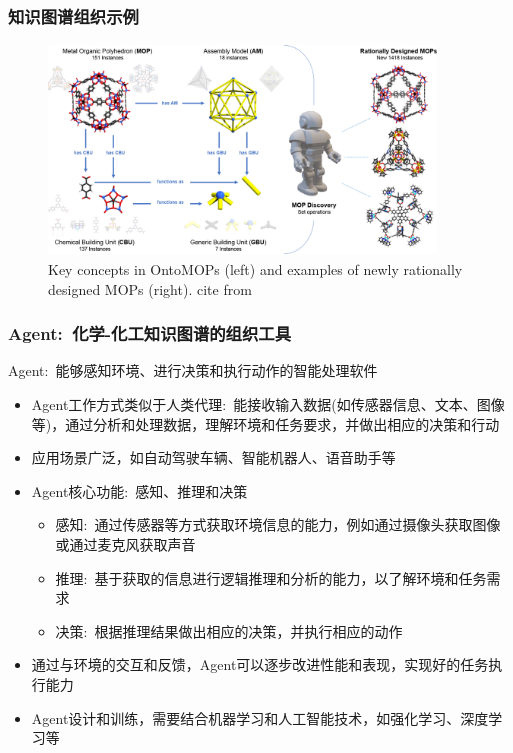 \frame
{
	\frametitle{知识图谱组织示例}
\begin{figure}[h!]
\centering
\vskip -8pt
\includegraphics[height=2.20in,width=4.05in,viewport=0 0 1330 700,clip]{Figures/Key_concepts-in-OntoMOPs-and-designed-MOPs.png}
\caption{\tiny\textrm{Key concepts in OntoMOPs (left) and examples of newly rationally designed MOPs (right). cite from~\cite{ACR56-128_2023}}}%
\label{Fig:OntoMOPs-MOPs}
\end{figure}
}

\frame
{
	\frametitle{\textrm{Agent}:~化学-化工知识图谱的组织工具}
	\textrm{Agent}:~能够感知环境、进行决策和执行动作的智能处理软件
	\begin{itemize}
		\item \textrm{Agent}工作方式类似于人类代理:~能接收输入数据(如传感器信息、文本、图像等)，通过分析和处理数据，理解环境和任务要求，并做出相应的决策和行动
		\item 应用场景广泛，如自动驾驶车辆、智能机器人、语音助手等
		\item \textrm{Agent}核心功能:~感知、推理和决策
			\begin{itemize}
				\item 感知:~通过传感器等方式获取环境信息的能力，例如通过摄像头获取图像或通过麦克风获取声音
				\item 推理:~基于获取的信息进行逻辑推理和分析的能力，以了解环境和任务需求
				\item 决策:~根据推理结果做出相应的决策，并执行相应的动作
			\end{itemize}
		\item 通过与环境的交互和反馈，\textrm{Agent}可以逐步改进性能和表现，实现好的任务执行能力\\
		\item \textrm{Agent}设计和训练，需要结合机器学习和人工智能技术，如强化学习、深度学习等
	\end{itemize}
}

